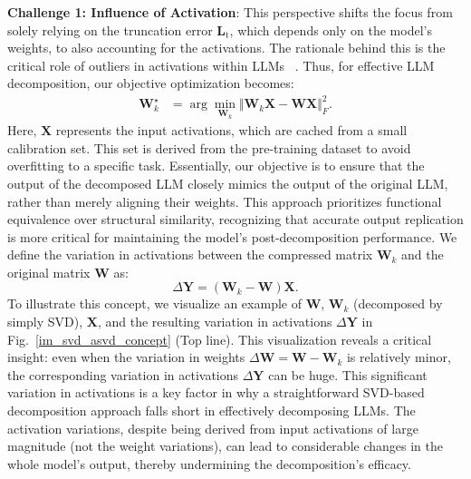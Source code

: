 \textbf{Challenge 1: Influence of Activation}: 
This perspective shifts the focus from solely relying on the truncation error $\mathbf{L}_{\text{t}}$, which depends only on the model's weights, to also accounting for the activations. The rationale behind this is the critical role of outliers in activations within LLMs ~\citep{lin2023awq,wei2022outlier,kim2023squeezellm}. Thus, for effective LLM decomposition, our objective optimization becomes:
\begin{equation}
\begin{aligned}
    \mathbf{W}_k^{\star} &= \arg\min_{\mathbf{W}_k}\Vert \mathbf{W}_k\mathbf{X} - \mathbf{W}\mathbf{X} \Vert_{F}^2.
\end{aligned}
\end{equation}
Here, $\mathbf{X}$ represents the input activations, which are cached from a small calibration set. This set is derived from the pre-training dataset to avoid overfitting to a specific task. 
Essentially, our objective is to ensure that the output of the decomposed LLM closely mimics the output of the original LLM, rather than merely aligning their weights. This approach prioritizes functional equivalence over structural similarity, recognizing that accurate output replication is more critical for maintaining the model's post-decomposition performance. 
We define the variation in activations between the compressed matrix $\mathbf{W}_k$ and the original matrix $\mathbf{W}$ as:
\begin{equation}
    \Delta\mathbf{Y} = (\mathbf{W}_k - \mathbf{W})\mathbf{X}. 
\label{eq:delta_y}
\end{equation}
To illustrate this concept, we visualize an example of $\mathbf{W}$, $\mathbf{W}_k$ (decomposed by simply SVD), $\mathbf{X}$, and the resulting variation in activations $\Delta\mathbf{Y}$ in Fig.~\ref{im_svd_asvd_concept} (Top line). This visualization reveals a critical insight: even when the variation in weights $\Delta\mathbf{W} = \mathbf{W} - \mathbf{W}_k$ is relatively minor, the corresponding variation in activations $\Delta\mathbf{Y}$ can be huge. This significant variation in activations is a key factor in why a straightforward SVD-based decomposition approach falls short in effectively decomposing LLMs. The activation variations, despite being derived from input activations of large magnitude (not the weight variations), can lead to considerable changes in the whole model's output, thereby undermining the decomposition's efficacy.


